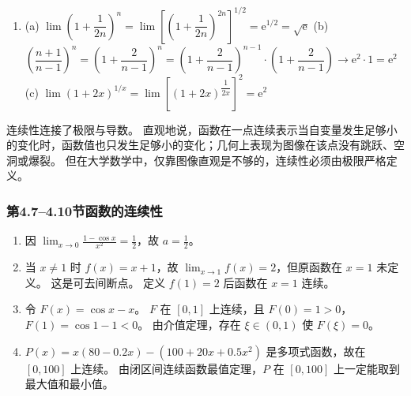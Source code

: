 \documentclass[fontset=fandol]{ctexart}
\newcommand{\ee}{\mathrm{e}}
\begin{document}
\begin{enumerate}
\item[10.] 
(a) \(\lim\left(1+\dfrac{1}{2n}\right)^n = \lim\left[\left(1+\dfrac{1}{2n}\right)^{2n}\right]^{1/2} = \ee^{1/2} = \sqrt{\ee}\) \quad
   (b) \(\left(\dfrac{n+1}{n-1}\right)^n = \left(1 + \dfrac{2}{n-1}\right)^n = \left(1 + \dfrac{2}{n-1}\right)^{n-1} \cdot \left(1 + \dfrac{2}{n-1}\right) \to \ee^2 \cdot 1 = \ee^2\) \quad
   (c) \(\lim (1+2x)^{1/x} = \lim \left[(1+2x)^{\dfrac{1}{2x}}\right]^2 = \ee^2\)
\end{enumerate}

连续性连接了极限与导数。 直观地说，函数在一点连续表示当自变量发生足够小的变化时，函数值也只发生足够小的变化；几何上表现为图像在该点没有跳跃、空洞或爆裂。 但在大学数学中，仅靠图像直观是不够的，连续性必须由极限严格定义。

\subsubsection*{第4.7--4.10节\quad 函数的连续性}

\begin{enumerate}[label=\textbf{练习\arabic*.},leftmargin=2.2em]
\item 因 $\lim_{x\to0}\frac{1-\cos x}{x^2}=\frac12$，故 $a=\frac12$。
\item 当 $x\neq1$ 时 $f(x)=x+1$，故 $\lim_{x\to1}f(x)=2$，但原函数在 $x=1$ 未定义。 这是可去间断点。 定义 $f(1)=2$ 后函数在 $x=1$ 连续。
\item 令 $F(x)=\cos x-x$。 $F$ 在 $[0,1]$ 上连续，且 $F(0)=1>0$，$F(1)=\cos1-1<0$。 由介值定理，存在 $\xi\in(0,1)$ 使 $F(\xi)=0$。
\item $P(x)=x(80-0.2x)-(100+20x+0.5x^2)$ 是多项式函数，故在 $[0,100]$ 上连续。 由闭区间连续函数最值定理，$P$ 在 $[0,100]$ 上一定能取到最大值和最小值。
\end{enumerate}

\fi
\end{document}
